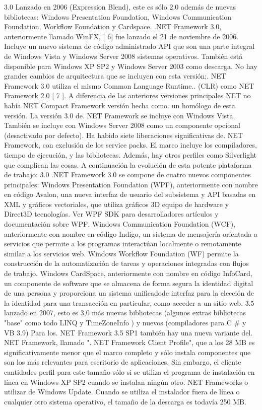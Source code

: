 3.0
Lanzado en 2006 (Expression Blend), este es sólo 2.0 además de nuevas bibliotecas: Windows Presentation Foundation, Windows Communication Foundation, Workflow Foundation y Cardspace. .NET Framework 3.0, anteriormente llamado WinFX, [ 6] fue lanzado el 21 de noviembre de 2006. Incluye un nuevo sistema de código administrado API que son una parte integral de Windows Vista y Windows Server 2008 sistemas operativos. También está disponible para Windows XP SP2 y Windows Server 2003 como descarga. No hay grandes cambios de arquitectura que se incluyen con esta versión;. NET Framework 3.0 utiliza el mismo Common Language Runtime.. (CLR) como NET Framework 2.0 [ 7 ]. A diferencia de las anteriores versiones principales NET no había NET Compact Framework versión hecha como. un homólogo de esta versión. La versión 3.0 de. NET Framework se incluye con Windows Vista. También se incluye con Windows Server 2008 como un componente opcional (desactivado por defecto).
Ha habido siete liberaciones significativas de. NET Framework, con exclusión de los service packs. El marco incluye los compiladores, tiempo de ejecución, y las bibliotecas. Además, hay otros perfiles como Silverlight que complican las cosas. A continuación la evolución de esta potente plataforma de trabajo:
3.0
.NET Framework 3.0 se compone de cuatro nuevos componentes principales:
Windows Presentation Foundation (WPF), anteriormente con nombre en código Avalon, una nueva interfaz de usuario del subsistema y API basadas en XML y gráficos vectoriales, que utiliza gráficos 3D equipo de hardware y Direct3D tecnologías. Ver WPF SDK para desarrolladores artículos y documentación sobre WPF.
Windows Communication Foundation (WCF), anteriormente con nombre en código Indigo, un sistema de mensajería orientada a servicios que permite a los programas interactúan localmente o remotamente similar a los servicios web.
Windows Workflow Foundation (WF) permite la construcción de la automatización de tareas y operaciones integradas con flujos de trabajo.
Windows CardSpace, anteriormente con nombre en código InfoCard, un componente de software que se almacena de forma segura la identidad digital de una persona y proporciona un sistema unificadode interfaz para la elección de la identidad para una transacción en particular, como acceder a un sitio web.
3.5
lanzado en 2007, esto es 3,0 más nuevas bibliotecas (algunos extras bibliotecas "base" como todo LINQ y TimeZoneInfo ) y nuevos (compiladores para C \# y VB 3.9)
Para los. NET Framework 3.5 SP1 también hay una nueva variante del. NET Framework, llamado ". NET Framework Client Profile", que a los 28 MB es significativamente menor que el marco completo y sólo instala componentes que son los más relevantes para escritorio de aplicaciones. Sin embargo, el cliente cantidades perfil para este tamaño sólo si se utiliza el programa de instalación en línea en Windows XP SP2 cuando se instalan ningún otro. NET Frameworks o utilizar de Windows Update. Cuando se utiliza el instalador fuera de línea o cualquier otro sistema operativo, el tamaño de la descarga es todavía 250 MB. 
